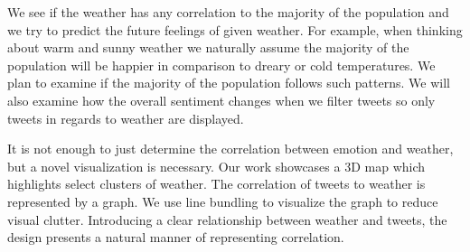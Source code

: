 We see if the weather has any correlation to the majority of the population and we try to predict the future feelings of given weather. For example, when thinking about warm and sunny weather we naturally assume the majority of the population will be happier in comparison to dreary or cold temperatures. We plan to examine if the majority of the population follows such patterns. We will also examine how the overall sentiment changes when we filter tweets so only tweets in regards to weather are displayed.

It is not enough to just determine the correlation between emotion and weather, but a novel visualization is necessary. Our work showcases a 3D map which highlights select clusters of weather. The correlation of tweets to weather is represented by a graph. We use line bundling to visualize the graph to reduce visual clutter. Introducing a clear relationship between weather and tweets, the design presents a natural manner of representing correlation. 